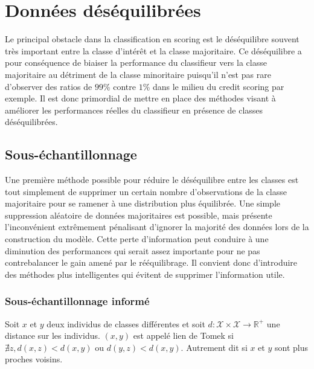 
\chapter{Données déséquilibrées}
\label{chap:cinq}



Le principal obstacle dans la classification en scoring est le déséquilibre souvent très important entre la classe d'intérêt et la classe majoritaire. Ce déséquilibre a pour conséquence de biaiser la performance du classifieur vers la classe majoritaire au détriment de la classe minoritaire puisqu'il n'est pas rare d'observer des ratios de $99$\% contre $1$\% dans le milieu du credit scoring par exemple. Il est donc primordial de mettre en place des méthodes visant à améliorer les performances réelles du classifieur en présence de classes déséquilibrées.

\section{Sous-échantillonnage}

Une première méthode possible pour réduire le déséquilibre entre les classes est tout simplement de supprimer un certain nombre d'observations de la classe majoritaire pour se ramener à une distribution plus équilibrée. Une simple suppression aléatoire de données majoritaires est possible, mais présente l'inconvénient extrêmement pénalisant d'ignorer la majorité des données lors de la construction du modèle. Cette perte d'information peut conduire à une diminution des performances qui serait assez importante pour ne pas contrebalancer le gain amené par le rééquilibrage. Il convient donc d'introduire des méthodes plus intelligentes qui évitent de supprimer l'information utile.

\subsection{Sous-échantillonnage informé}

\begin{definition}
    Soit $x$ et $y$ deux individus de classes différentes et soit $d : \mathcal{X} \times \mathcal{X} \rightarrow \mathbb{R}^+$ une distance sur les individus.
    $(x,y)$ est appelé lien de Tomek si $\nexists z , d(x,z) < d(x,y) \text{ ou } d(y,z) < d(x,y)$. Autrement dit si $x$ et $y$ sont plus proches voisins.
\end{definition}

